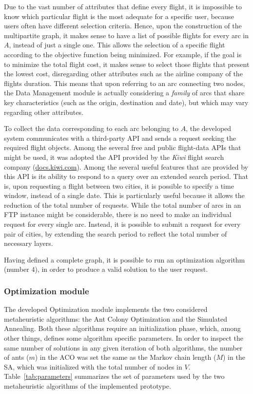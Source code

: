 \documentclass[onecolumn]{elsarticle}
\begin{document}
Due to the vast number of attributes that define every flight, it is impossible to know which particular flight is the most adequate for a specific user, because users often have different selection criteria. Hence, upon the construction of the multipartite graph, it makes sense to have a list of possible flights for every arc in $A$, instead of just a single one. This allows the selection of a specific flight according to the objective function being minimized. For example, if the goal is to minimize the total flight cost, it makes sense to select those flights that present the lowest cost, disregarding other attributes such as the airline company of the flights duration. This means that upon referring to an arc connecting two nodes, the Data Management module is actually considering a \textit{family} of arcs that share key characteristics (such as the origin, destination and date), but which may vary regarding other attributes.

To collect the data corresponding to each arc belonging to $A$, the developed system communicates with a third-party API and sends a request seeking the required flight objects. Among the several free and public flight-data APIs that might be used, it was adopted the API provided by the \textit{Kiwi} flight search company (\url{docs.kiwi.com}). 
Among the several useful features that are provided by this API is its ability to respond to a query over an extended search period. That is, upon requesting a flight between two cities, it is possible to specify a time window, instead of a single date. This is particularly useful because it allows the reduction of the total number of requests. While the total number of arcs in an FTP instance might be considerable, there is no need to make an individual request for every single arc. Instead, it is possible to submit a request for every pair of cities, by extending the search period to reflect the total number of necessary layers.

Having defined a complete graph, it is possible to run an optimization algorithm (number 4), in order to produce a valid solution to the user request. 


\subsubsection*{Optimization module}

The developed Optimization module implements the two considered metaheuristic algorithms: the Ant Colony Optimization and the Simulated Annealing. Both these algorithms require an initialization phase, which, among other things, defines some algorithm specific parameters. In order to inspect the same number of solutions in any given iteration of both algorithms, the number of ants ($m$) in the ACO was set the same as the Markov chain length ($M$) in the SA, which was initialized with the total number of nodes in $V$. Table~\ref{tab:parameters} summarizes the set of parameters used by the two metaheuristic algorithms of the implemented prototype.
\end{document}
